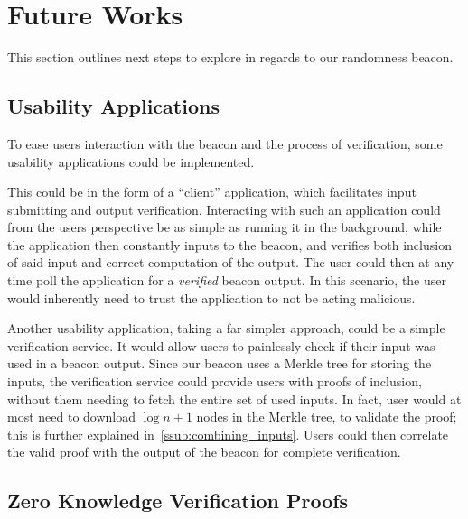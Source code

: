 \section{Future Works}%
\label{sec:future_works}
This section outlines next steps to explore in regards to our randomness beacon.


\subsection{Usability Applications}%
\label{sub:usability_applications}
To ease users interaction with the beacon and the process of verification, some usability applications could be implemented.

This could be in the form of a \enquote{client} application, which facilitates input submitting and output verification.
Interacting with such an application could from the users perspective be as simple as running it in the background, while the application then constantly inputs to the beacon, and verifies both inclusion of said input and correct computation of the output.
The user could then at any time poll the application for a \emph{verified} beacon output.
In this scenario, the user would inherently need to trust the application to not be acting malicious.

Another usability application, taking a far simpler approach, could be a simple verification service.
It would allow users to painlessly check if their input was used in a beacon output.
Since our beacon uses a Merkle tree for storing the inputs, the verification service could provide users with proofs of inclusion, without them needing to fetch the entire set of used inputs.
In fact, user would at most need to download $\log n + 1$ nodes in the Merkle tree, to validate the proof; this is further explained in~\vref{ssub:combining_inputs}.
Users could then correlate the valid proof with the output of the beacon for complete verification.

\subsection{Zero Knowledge Verification Proofs}%
\label{sub:zero_knowledge_verification_proofs}

